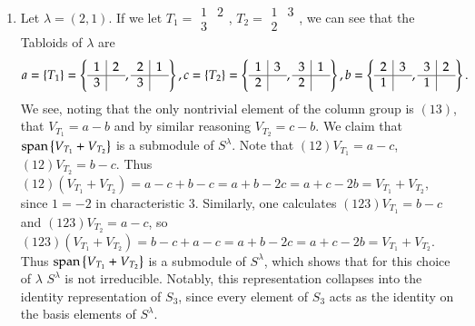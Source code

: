 \documentclass[12pt]{article}
\theoremstyle{definitionstyle}
\newcommand{\SET}[1]{\Set{\mskip-\medmuskip #1 \mskip-\medmuskip}}
\begin{document}
\begin{enumerate}
        \item Let $\lambda = (2, 1)$. If we let $T_1 = \begin{array}{c|c}
            1 & 2 \\ \hline
            3 &
        \end{array}$, $T_2 = \begin{array}{c|c}
            1 & 3 \\ \hline
            2 &
        \end{array}$, we can see that the Tabloids of $\lambda$ are 
        \begin{align*}
            a = \SET{T_1} = \SET{\begin{array}{c|c}
                1 & 2 \\ \hline
                3 & 
            \end{array}, 
            \begin{array}{c|c}
                2 & 1 \\ \hline
                3 &
            \end{array}}, 
            c = \SET{T_2} = \SET{\begin{array}{c|c}
                1 & 3 \\ \hline
                2 & 
            \end{array},
            \begin{array}{c|c}
                3 & 1 \\ \hline
                2 &
            \end{array}},
            b = \SET{\begin{array}{c|c}
                2 & 3 \\ \hline
                1 &
            \end{array},
            \begin{array}{c|c}
                3 & 2 \\ \hline
                1 &
            \end{array}}.
        \end{align*}
        We see, noting that the only nontrivial element of the column group is $(13)$, that $V_{T_1} = a-b$ and by similar reasoning $V_{T_2} = c-b$. We claim that $\mathrm{span}\SET{V_{T_1}+V_{T_2}}$ is a submodule of $S^\lambda$. Note that $(12)V_{T_1} = a - c$, $(12)V_{T_2} = b - c$. Thus $(12)(V_{T_1}+V_{T_2}) = a - c + b - c = a + b - 2c = a + c - 2b = V_{T_1}+V_{T_2}$, since $1 = -2$ in characteristic 3. Similarly, one calculates $(123)V_{T_1} = b-c$ and $(123)V_{T_2} = a-c$, so $(123)(V_{T_1}+V_{T_2}) = b - c + a - c = a + b - 2c = a + c - 2b = V_{T_1}+V_{T_2}$. Thus $\mathrm{span}\SET{V_{T_1}+V_{T_2}}$ is a submodule of $S^\lambda$, which shows that for this choice of $\lambda$ $S^\lambda$ is not irreducible. Notably, this representation collapses into the identity representation of $S_3$, since every element of $S_3$ acts as the identity on the basis elements of $S^\lambda$.
    \end{enumerate}
\end{document}
